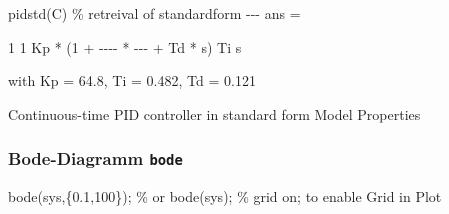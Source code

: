 \documentclass[
  10pt,
  a4paper,
  twocolumn]{article}
\newenvironment{Shaded}{}{}
\newcommand{\CommentTok}[1]{\textcolor[rgb]{0.42,0.45,0.49}{#1}}
\newcommand{\FloatTok}[1]{\textcolor[rgb]{0.00,0.36,0.77}{#1}}
\newcommand{\NormalTok}[1]{\textcolor[rgb]{0.14,0.16,0.18}{#1}}
\newcommand{\OperatorTok}[1]{\textcolor[rgb]{0.14,0.16,0.18}{#1}}
\newcommand{\VariableTok}[1]{\textcolor[rgb]{0.89,0.38,0.04}{#1}}
\numberwithin{equation}{section}
\begin{document}
\begin{Shaded}
\begin{Highlighting}[]
\VariableTok{pidstd}\NormalTok{(}\VariableTok{C}\NormalTok{) }\CommentTok{\% retreival of standardform}
\OperatorTok{{-}{-}{-}}
\VariableTok{ans} \OperatorTok{=}
 
             \FloatTok{1}      \FloatTok{1}          
  \VariableTok{Kp} \OperatorTok{*}\NormalTok{ (}\FloatTok{1} \OperatorTok{+} \OperatorTok{{-}{-}{-}{-}} \OperatorTok{*} \OperatorTok{{-}{-}{-}} \OperatorTok{+} \VariableTok{Td} \OperatorTok{*} \VariableTok{s}\NormalTok{)}
             \VariableTok{Ti}     \VariableTok{s}          

  \VariableTok{with} \VariableTok{Kp} \OperatorTok{=} \FloatTok{64.8}\OperatorTok{,} \VariableTok{Ti} \OperatorTok{=} \FloatTok{0.482}\OperatorTok{,} \VariableTok{Td} \OperatorTok{=} \FloatTok{0.121}
 
\VariableTok{Continuous}\OperatorTok{{-}}\VariableTok{time} \VariableTok{PID} \VariableTok{controller} \VariableTok{in} \VariableTok{standard} \VariableTok{form}
\VariableTok{Model} \VariableTok{Properties}
\end{Highlighting}
\end{Shaded}

\hypertarget{bode-diagramm-bode}{%
\subsubsection{\texorpdfstring{Bode-Diagramm
\texttt{bode}}{Bode-Diagramm bode}}\label{bode-diagramm-bode}}

\begin{Shaded}
\begin{Highlighting}[]
\VariableTok{bode}\NormalTok{(}\VariableTok{sys}\OperatorTok{,}\NormalTok{\{}\FloatTok{0.1}\OperatorTok{,}\FloatTok{100}\NormalTok{\})}\OperatorTok{;} \CommentTok{\% or bode(sys);}
\CommentTok{\% grid on; to enable Grid in Plot}
\end{Highlighting}
\end{Shaded}
\end{document}
